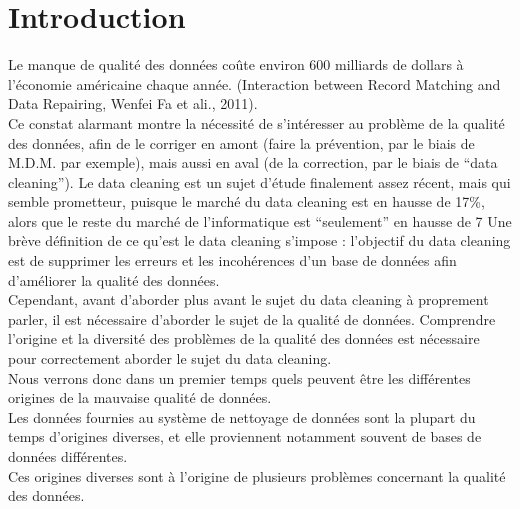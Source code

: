 \section{Introduction}
Le manque de qualité des données coûte environ 600 milliards de dollars à l’économie américaine chaque année. (Interaction between Record Matching and Data Repairing, Wenfei Fa et ali., 2011).\\
Ce constat alarmant montre la nécessité de s’intéresser au problème de la qualité des données, afin de le corriger en amont (faire la prévention, par le biais de M.D.M. par exemple), mais aussi en aval (de la correction, par le biais de “data cleaning”).
Le data cleaning est un sujet d’étude finalement assez récent, mais qui semble prometteur, puisque le marché du data cleaning est en hausse de 17\%, alors que le reste du marché de l’informatique est “seulement” en hausse de 7%
Une brève définition de ce qu’est le data cleaning s’impose : l’objectif du data cleaning est de supprimer les erreurs et les incohérences d’un base de données afin d’améliorer la qualité des données.\\
Cependant, avant d’aborder plus avant le sujet du data cleaning à proprement parler, il est nécessaire d’aborder le sujet de la qualité de données. Comprendre l’origine et la diversité des problèmes de la qualité des données est nécessaire pour correctement aborder le sujet du data cleaning.\\
Nous verrons donc dans un premier temps quels peuvent être les différentes origines de la mauvaise qualité de données.\\
Les données fournies au système de nettoyage de données sont la plupart du temps d’origines diverses, et elle proviennent notamment souvent de bases de données différentes.\\
Ces origines diverses sont à l’origine de plusieurs problèmes concernant la qualité des données.\\
